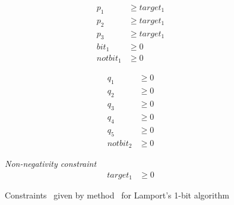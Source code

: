 \begin{figure}[t]
\begin{minipage}{\columnwidth}
\begin{minipage}[t]{.49\columnwidth}
\begin{align*}
        p_1   & \ge target_1 \\[-0.4em]
        p_2   & \ge target_1 \\[-0.4em]
        p_3   & \ge target_1 \\[-0.4em]
        bit_1 & \ge 0        \\[-0.4em]
        notbit_1 & \ge 0
      \end{align*}
    \end{minipage}
    \begin{minipage}[t]{.49\columnwidth}
      \centering
      \begin{align*}
        q_1   & \ge 0 \\[-0.4em]
        q_2   & \ge 0 \\[-0.4em]
        q_3   & \ge 0 \\[-0.4em]
        q_4   & \ge 0 \\[-0.4em]
        q_5   & \ge 0 \\[-0.4em]
        notbit_2 & \ge 0
      \end{align*}
    \end{minipage}
  \end{minipage}
  \begin{minipage}{\columnwidth}
    \emph{Non-negativity constraint}\\[-2em]
    \begin{align*}
      target_1 & \ge 0
    \end{align*}
  \end{minipage}
  \caption{Constraints \setCp\ given by method \invariant\ for
    Lamport's 1-bit algorithm}
  \label{fig_setCp}
\end{figure}

